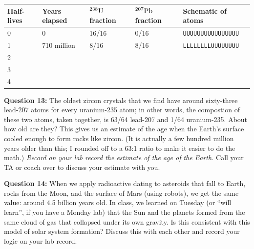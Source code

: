 \documentclass[11pt]{article}
\begin{document}
\vspace{1em}

\Large
\begin{tabular}{|l|l|l|l|l|}
\hline
Half-lives & Years elapsed & ${}^{238}\rm U$ fraction & ${}^{207}\rm Pb$ fraction & Schematic of atoms                          \\ \hline
0                                   & 0                              & 16/16                                            & 0/16                                          & {\tt UUUUUUUUUUUUUUUU} \\\hline
1                                   & 710 million                    & 8/16                                             & 8/16                                          & {\tt LLLLLLLLUUUUUUUU} \\\hline
2                                   &                                &                                                  &                                               &                                             \\\hline
3                                   &                                &                                                  &                                               &                                             \\\hline
4                                   &                                &                                                  &                                               &                                             \\\hline
\end{tabular}

\normalsize
\vspace{1cm}

{\bf Question 13:} The oldest zircon crystals that we find have around sixty-three lead-207 atoms for every uranium-235 atom; in other words, the
compostion of these two atoms, taken together, is 63/64 lead-207 and 1/64 uranium-235.
 About how old are they? This gives us an estimate of the age when the Earth's surface cooled enough to form rocks like 
zircon. (It is actually a few hundred million years older than this; I rounded off to a 63:1 ratio to make it easier to do the math.) {\it Record on your lab record the estimate of the age of the Earth.} Call your TA or coach over to discuss your estimate with you.

\vspace{1.2in}

{\bf Question 14:} When we apply radioactive dating to asteroids that fall to Earth, rocks from the Moon, and the surface of Mars (using robots), we get the same value: around 4.5 billion years old. In class, we learned on Tuesday (or ``will learn'', if you have a Monday lab) that the Sun and the planets formed from the same cloud of gas that collapsed under its own gravity.   Is this consistent with this model of solar system formation? Discuss this with each other and record your logic on your lab record. 
\end{document}
